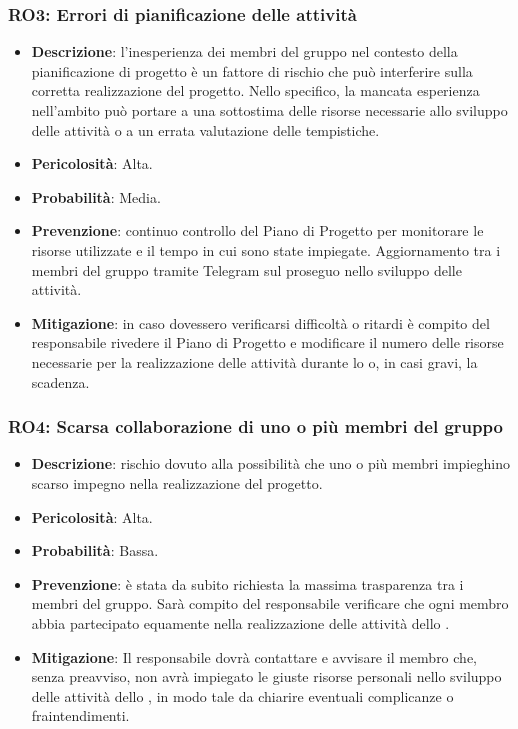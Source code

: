 \subsubsection{RO3: Errori di pianificazione delle attività}
\label{rischio:RO3}
\begin{itemize}
    \item \textbf{Descrizione}: l'inesperienza dei membri del gruppo nel contesto della pianificazione di progetto è un fattore di rischio che può interferire sulla corretta realizzazione del progetto. 
    Nello specifico, la mancata esperienza nell'ambito può portare a una sottostima delle risorse necessarie allo sviluppo delle attività o a un errata valutazione delle tempistiche. 
    \item \textbf{Pericolosità}: Alta.
    \item \textbf{Probabilità}: Media.
    \item \textbf{Prevenzione}: continuo controllo del Piano di Progetto per monitorare le risorse utilizzate e il tempo in cui sono state impiegate.
    Aggiornamento tra i membri del gruppo tramite Telegram sul proseguo nello sviluppo delle attività.
    \item \textbf{Mitigazione}: in caso dovessero verificarsi difficoltà o ritardi è compito del responsabile rivedere il Piano di Progetto e modificare il numero delle risorse necessarie per la realizzazione delle attività durante lo  o, in casi gravi, la scadenza.
\end{itemize}

\subsubsection{RO4: Scarsa collaborazione di uno o più membri del gruppo}
\label{rischio:RO4}
\begin{itemize}
    \item \textbf{Descrizione}: rischio dovuto alla possibilità che uno o più membri impieghino scarso impegno nella realizzazione del progetto.
    \item \textbf{Pericolosità}: Alta.
    \item \textbf{Probabilità}: Bassa.
    \item \textbf{Prevenzione}: è stata da subito richiesta la massima trasparenza tra i membri del gruppo.
    Sarà compito del responsabile verificare che ogni membro abbia partecipato equamente nella realizzazione delle attività dello .
    \item \textbf{Mitigazione}: Il responsabile dovrà contattare e avvisare il membro che, senza preavviso, non avrà impiegato le giuste risorse personali nello sviluppo delle attività dello , in modo tale da chiarire eventuali complicanze o fraintendimenti. 
\end{itemize}


